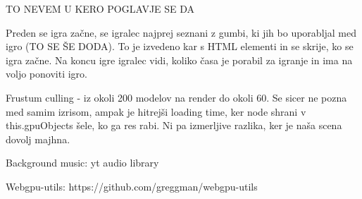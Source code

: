 \documentclass[a4paper,12pt]{article}
\begin{document}
 \newpage
 
 TO NEVEM U KERO POGLAVJE SE DA

Preden se igra začne, se igralec najprej seznani z gumbi, ki jih bo uporabljal med igro (TO SE ŠE DODA). To je izvedeno kar s HTML elementi in se skrije, ko se igra začne. Na koncu igre igralec vidi, koliko časa je porabil za igranje in ima na voljo ponoviti igro.

Frustum culling - iz okoli 200 modelov na render do okoli 60. Se sicer ne pozna med samim izrisom, ampak je hitrejši loading time, ker node shrani v this.gpuObjects šele, ko ga res rabi. Ni pa izmerljive razlika, ker je naša scena dovolj majhna.


Background music: yt audio library

Webgpu-utils: https://github.com/greggman/webgpu-utils
\end{document}
